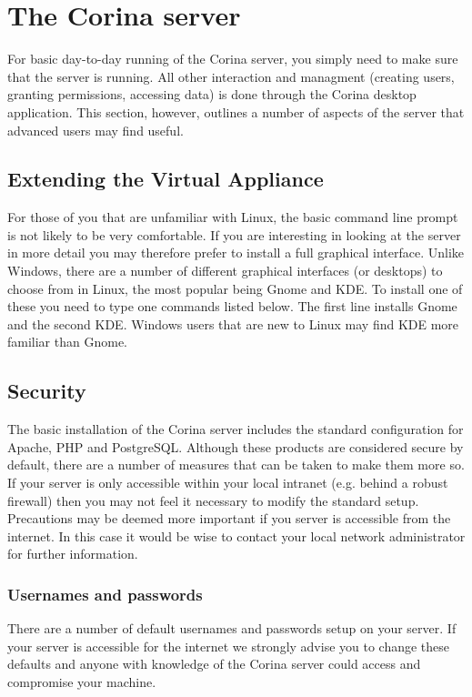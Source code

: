 
\chapter{The Corina server}
\label{txt:servermaintenance}

For basic day-to-day running of the Corina server, you simply need to make sure that the server is running.  All other interaction and managment (creating users, granting permissions, accessing data) is done through the Corina desktop application.  This section, however, outlines a number of aspects of the server that advanced users may find useful.

\section{Extending the Virtual Appliance}
For those of you that are unfamiliar with Linux, the basic command line prompt is not likely to be very comfortable.  If you are interesting in looking at the server in more detail you may therefore prefer to install a full graphical interface.  Unlike Windows, there are a number of different graphical interfaces (or desktops) to choose from in Linux, the most popular being Gnome and KDE.  To install one of these you need to type one commands listed below.  The first line installs Gnome and the second KDE. Windows users that are new to Linux may find KDE more familiar than Gnome.


\section{Security}
The basic installation of the Corina server includes the standard configuration for Apache, PHP and PostgreSQL.  Although these products are considered secure by default, there are a number of measures that can be taken to make them more so.  If your server is only accessible within your local intranet (e.g. behind a robust firewall) then you may not feel it necessary to modify the standard setup.  Precautions may be deemed more important if you server is accessible from the internet.  In this case it would be wise to contact your local network administrator for further information.

\subsection{Usernames and passwords}
There are a number of default usernames and passwords setup on your server.  If your server is accessible for the internet we strongly advise you to change these defaults and anyone with knowledge of the Corina server could access and compromise your machine.

